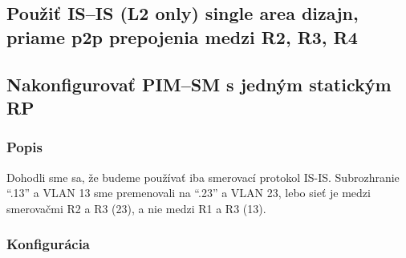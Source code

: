\documentclass[12pt,twoside,a4paper]{report}
\begin{document}
\subsection{Použiť IS–IS (L2 only) single area dizajn, priame p2p prepojenia medzi R2, R3, R4}
\subsection{Nakonfigurovať PIM–SM s jedným statickým RP}
\subsubsection{Popis}
Dohodli sme sa, že budeme používať iba smerovací protokol IS-IS.
Subrozhranie “.13” a VLAN 13 sme premenovali na “.23” a VLAN 23, lebo sieť je medzi smerovačmi R2 a R3 (23), a nie medzi R1 a R3 (13).


\subsubsection{Konfigurácia}
\end{document}

